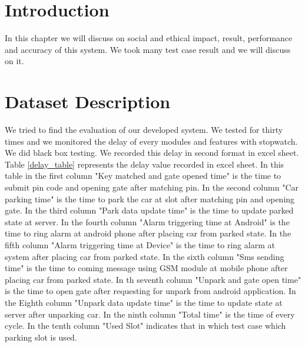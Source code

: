 \section{Introduction}
In this chapter we will discuss on social and ethical impact, result, performance and accuracy of this system. We took many test case result and we will discuss on it.

\section{Dataset Description}
We tried to find the evaluation of our developed system. We tested for thirty times and we monitored the delay of every modules and features with stopwatch. We did black box testing. We recorded this delay in second format in excel sheet. Table \ref{delay_table} represents the delay value recorded in excel sheet. In this table in the first column "Key matched and gate opened time" is the time to submit pin code and opening gate after matching pin. In the second column "Car parking time" is the time to park the car at slot after matching pin and opening gate. In the third column "Park data update time" is the time to update parked state at server. In the fourth column "Alarm triggering time at Android" is the time to ring alarm at android phone after placing car from parked state. In the fifth column "Alarm triggering time at Device" is the time to ring alarm at system after placing car from parked state. In the sixth column "Sms sending time" is the time to coming message using GSM module at mobile phone after placing car from parked state. In th seventh column "Unpark and gate open time" is the time to open gate after requesting for unpark from android application. In the Eighth column "Unpark data update time" is the time to update state at server after unparking car. In the ninth column "Total time" is the time of every cycle. In the tenth column "Used Slot" indicates that in which test case which parking slot is used. 

